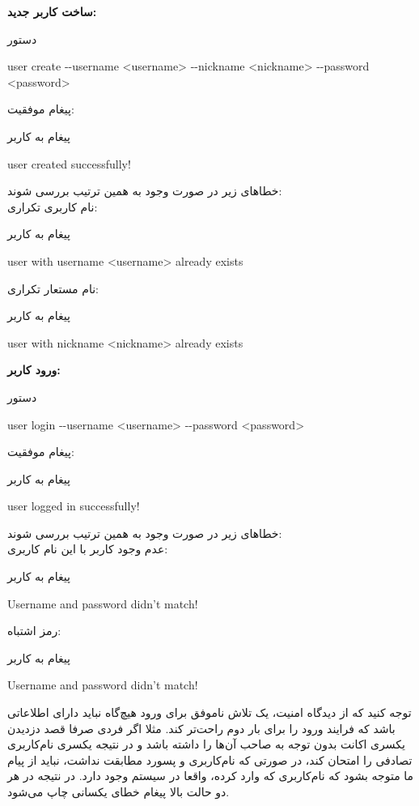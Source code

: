 \documentclass[]{article}
\begin{document}
\vspace{.5cm}
\textbf{ساخت کاربر جدید:}
\begin{mybox}[colback=yellow]{دستور}
	\begin{latin}	
		user create -{}-username <username> -{}-nickname <nickname> 
		-{}-password 
		<password>
	\end{latin}
\end{mybox}
پیغام موفقیت:
\begin{mybox}[colback=yellow]{پیغام به کاربر}
	\begin{latin}	
		user created successfully!
	\end{latin}
\end{mybox}
خطا‌های زیر در صورت وجود به همین ترتیب بررسی شوند:
\\
نام کاربری تکراری:
\begin{mybox}[colback=yellow]{پیغام به کاربر}
	\begin{latin}	
		user with username <username> already exists
	\end{latin}
\end{mybox}
نام مستعار تکراری:
\begin{mybox}[colback=yellow]{پیغام به کاربر}
	\begin{latin}	
		user with nickname <nickname> already exists
	\end{latin}
\end{mybox}

\vspace{.5cm}
\textbf{ورود کاربر:}
\begin{mybox}[colback=yellow]{دستور}
	\begin{latin}	
		user login -{}-username <username> -{}-password <password>
	\end{latin}
\end{mybox}
پیغام موفقیت:
\begin{mybox}[colback=yellow]{پیغام به کاربر}
	\begin{latin}	
		user logged in successfully!
	\end{latin}
\end{mybox}
خطا‌های زیر در صورت وجود به همین ترتیب بررسی شوند:
\\
عدم وجود کاربر با این نام کاربری:
\begin{mybox}[colback=yellow]{پیغام به کاربر}
	\begin{latin}	
		Username and password didn’t match!
	\end{latin}
\end{mybox}
رمز اشتباه:
\begin{mybox}[colback=yellow]{پیغام به کاربر}
	\begin{latin}	
		Username and password didn’t match!
	\end{latin}
\end{mybox}
توجه کنید که از دیدگاه امنیت، یک تلاش ناموفق برای ورود هیچ‌گاه نباید دارای 
اطلاعاتی باشد که فرایند ورود را برای بار دوم راحت‌تر کند. مثلا اگر فردی 
صرفا 
قصد دزدیدن یکسری اکانت بدون توجه به صاحب آن‌ها را داشته باشد و در نتیجه 
یکسری نام‌کاربری تصادفی را امتحان کند، در صورتی که نام‌کاربری و پسورد مطابقت 
نداشت، نباید از پیام ما متوجه بشود که نام‌کاربری که وارد کرده، واقعا در 
سیستم وجود دارد. در نتیجه در هر دو حالت بالا پیغام خطای یکسانی چاپ می‌شود.
\end{document}

